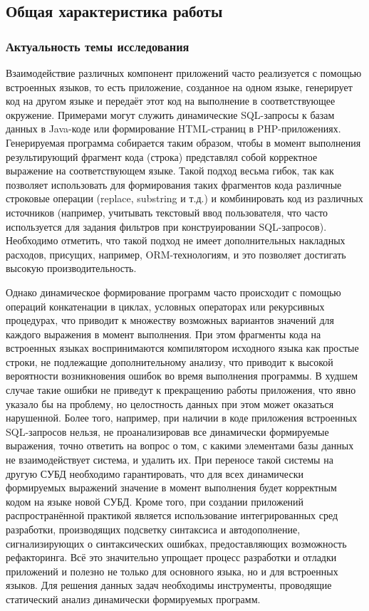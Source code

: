 \subsection*{\Large Общая характеристика работы}
\fontsize{14pt}{15pt}\selectfont
\subsubsection*{\large{Актуальность темы исследования}}

Взаимодействие различных компонент приложений часто реализуется с помощью встроенных языков, то есть приложение, созданное на одном языке, генерирует код на другом языке и передаёт этот код на выполнение в соответствующее окружение. Примерами могут служить динамические SQL-запросы к базам данных в Java-коде или формирование HTML-страниц в PHP-приложениях. Генерируемая программа собирается таким образом, чтобы в момент выполнения результирующий фрагмент кода (строка) представлял собой корректное выражение на соответствующем языке. Такой подход весьма гибок, так как позволяет использовать для формирования таких фрагментов кода различные строковые операции (replace, substring и т.д.) и комбинировать код из различных источников (например, учитывать текстовый ввод пользователя, что часто используется для задания фильтров при конструировании SQL-запросов). Необходимо отметить, что такой подход не имеет дополнительных накладных расходов, присущих, например, ORM-технологиям, и это позволяет достигать высокую производительность. 

Однако динамическое формирование программ часто происходит с помощью операций конкатенации в циклах, условных операторах или рекурсивных процедурах, что приводит к множеству возможных вариантов значений для каждого выражения в момент выполнения. При этом фрагменты кода на встроенных языках воспринимаются компилятором исходного языка как простые строки, не подлежащие дополнительному анализу, что приводит к высокой вероятности возникновения ошибок во время выполнения программы. В худшем случае такие ошибки не приведут к прекращению работы приложения, что явно указало бы на проблему, но целостность данных при этом может оказаться нарушенной. Более того, например, при наличии в коде приложения встроенных SQL-запросов нельзя, не проанализировав все динамически формируемые выражения, точно ответить на вопрос о том, с какими элементами базы данных не взаимодействует система, и  удалить их. При переносе такой системы на другую СУБД необходимо гарантировать, что для всех динамически формируемых выражений значение в момент выполнения будет корректным кодом на языке новой СУБД. Кроме того, при создании приложений распространённой практикой является использование интегрированных сред разработки, производящих подсветку синтаксиса и автодополнение, сигнализирующих о синтаксических ошибках, предоставляющих возможность рефакторинга. Всё это значительно упрощает процесс разработки и отладки приложений и полезно не только для основного языка, но и для встроенных языков. Для решения данных задач необходимы инструменты, проводящие статический анализ динамически формируемых программ.  

